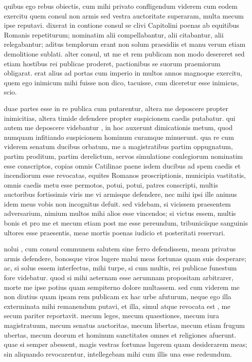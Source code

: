  quibus ego rebus obiectis, cum mihi privato confligendum viderem cum eodem exercitu quem consul non armis sed vestra auctoritate superaram, multa mecum ipse reputavi. dixerat in contione consul se clivi Capitolini poenas ab equitibus Romanis repetiturum; nominatim alii compellabantur, alii citabantur, alii relegabantur; aditus templorum erant non solum praesidiis et manu verum etiam demolitione sublati. alter consul, ut me et rem publicam non modo desereret sed etiam hostibus rei publicae proderet, pactionibus se suorum praemiorum obligarat. erat alius ad portas cum imperio in multos annos magnoque exercitu, quem ego inimicum mihi fuisse non dico, tacuisse, cum diceretur esse inimicus, scio.

 duae partes esse in re publica cum putarentur, altera me deposcere propter inimicitias, altera timide defendere propter suspicionem caedis putabatur. qui autem me deposcere videbantur , in hoc auxerunt dimicationis metum, quod numquam infitiando suspicionem hominum curamque minuerunt. qua re cum viderem senatum ducibus orbatum, me a magistratibus partim oppugnatum, partim proditum, partim derelictum, servos simulatione conlegiorum nominatim esse conscriptos, copias omnis Catilinae paene isdem ducibus ad spem caedis et incendiorum esse revocatas, equites Romanos proscriptionis, municipia vastitatis, omnis caedis metu esse permotos, potui, potui, patres conscripti, multis auctoribus fortissimis viris me vi armisque defendere, nec mihi ipsi ille animus idem meus vobis non incognitus defuit. sed videbam, si vicissem praesentem adversarium, nimium multos mihi alios esse vincendos; si victus essem, multis bonis et pro me et mecum etiam post me esse pereundum, tribuniciique sanguinis ultores esse praesentis, meae mortis poenas iudicio et posteritati reservari.

 nolui , cum consul communem salutem sine ferro defendissem, meam privatus armis defendere, bonosque viros lugere malui meas fortunas quam suis desperare; ac, si solus essem interfectus, mihi turpe, si cum multis, rei publicae funestum fore videbatur. quod si mihi aeternam esse aerumnam propositam arbitrarer, morte me ipse potius quam sempiterno dolore multassem. sed cum viderem me non diutius quam ipsam rem publicam ex hac urbe afuturum, neque ego illa exterminata mihi remanendum putavi, et illa, simul atque revocata est , me secum pariter reportavit. mecum leges, mecum quaestiones, mecum iura magistratuum, mecum senatus auctoritas, mecum libertas, mecum etiam frugum ubertas, mecum deorum et hominum sanctitates omnes et religiones afuerunt. quae si semper abessent, magis vestras fortunas lugerem quam desiderarem meas; sin aliquando revocarentur, intellegebam mihi cum illis una esse redeundum.

